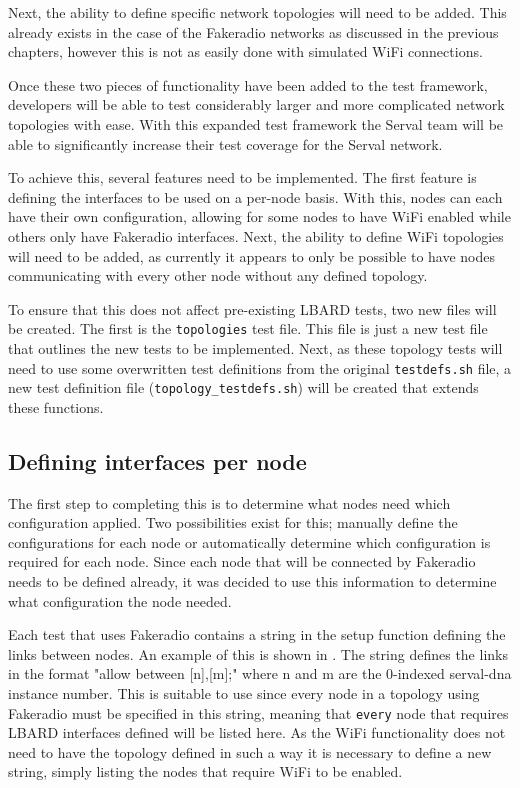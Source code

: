 Next, the ability to define specific network topologies will need to be added.
This already exists in the case of the Fakeradio networks as discussed in the previous chapters, however this is not as easily done with simulated WiFi connections.

Once these two pieces of functionality have been added to the test framework, developers will be able to test considerably larger and more complicated network topologies with ease.
With this expanded test framework the Serval team will be able to significantly increase their test coverage for the Serval network.


To achieve this, several features need to be implemented. 
The first feature is defining the interfaces to be used on a per-node basis.
With this, nodes can each have their own configuration, allowing for some nodes to have WiFi enabled while others only have Fakeradio interfaces.
Next, the ability to define WiFi topologies will need to be added, as currently it appears to only be possible to have nodes communicating with every other node without any defined topology.

To ensure that this does not affect pre-existing LBARD tests, two new files will be created.
The first is the \verb|topologies| test file.
This file is just a new test file that outlines the new tests to be implemented.
Next, as these topology tests will need to use some overwritten test definitions from the original \texttt{testdefs.sh} file, a new test definition file (\texttt{topology\_testdefs.sh}) will be created that extends these functions.



\subsection{Defining interfaces per node}


The first step to completing this is to determine what nodes need which configuration applied.
Two possibilities exist for this; manually define the configurations for each node or automatically determine which configuration is required for each node.
Since each node that will be connected by Fakeradio needs to be defined already, it was decided to use this information to determine what configuration the node needed.

Each test that uses Fakeradio contains a string in the setup function defining the links between nodes.
An example of this is shown in . 
The string defines the links in the format "allow between [n],[m];" where n and m are the 0-indexed serval-dna instance number.
This is suitable to use since every node in a topology using Fakeradio must be specified in this string, meaning that \verb|every| node that requires LBARD interfaces defined will be listed here.
As the WiFi functionality does not need to have the topology defined in such a way it is necessary to define a new string, simply listing the nodes that require WiFi to be enabled. 

